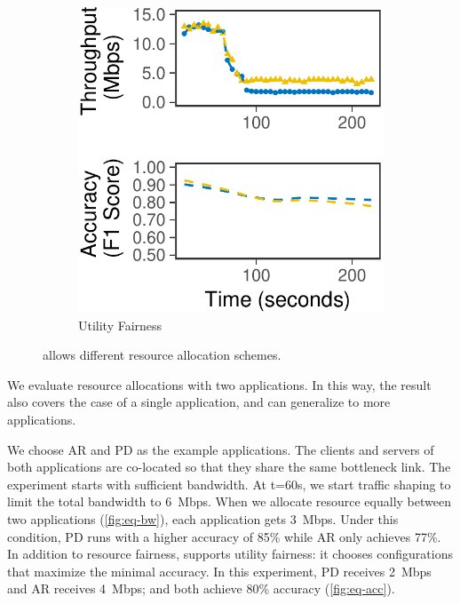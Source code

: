 \begin{figure}
\begin{subfigure}[t]{0.45\columnwidth}
    \includegraphics[width=\textwidth]{figures/multitask-right.pdf}
    \caption{Utility Fairness}
    \label{fig:eq-acc}
  \end{subfigure}
  \caption{\sysname{} allows different resource allocation schemes.}
  \label{fig:multitask}
  \vspace{-0.8em}
\end{figure}

We evaluate resource allocations with two applications. In this way, the result
also covers the case of a single application, and can generalize to more
applications.

We choose AR and PD as the example applications.  The clients and servers of
both applications are co-located so that they share the same bottleneck
link. The experiment starts with sufficient bandwidth. At t=60s, we start
traffic shaping to limit the total bandwidth to \SI{6}{Mbps}. When we allocate
resource equally between two applications (\autoref{fig:eq-bw}), each
application gets \SI{3}{Mbps}. Under this condition, PD runs with a higher
accuracy of 85\% while AR only achieves 77\%. In addition to resource fairness,
\sysname{} supports utility fairness: it chooses configurations that maximize
the minimal accuracy. In this experiment, PD receives \SI{2}{Mbps} and AR
receives \SI{4}{Mbps}; and both achieve 80\% accuracy (\autoref{fig:eq-acc}).


